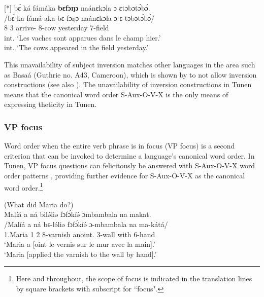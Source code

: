 \documentclass[output=paper,colorlinks,citecolor=brown
]{langscibook}
\begin{document}
\ea
[*]{
\label{cowinversion}
\glll
{\db}bɛ́ ká fámáka \textbf{bɛfɔŋɔ} naánɛkɔla ɔ ɛtɔbɔtɔ́bɔ́. \\
/bɛ́ ka fámá-aka bɛ-fɔŋɔ naánɛkɔla ɔ ɛ-tɔbɔtɔ́bɔ́/ \\
{\db}8\SM{} \PST{}3{} arrive-\DUR{} 8-cow yesterday \PREP{} 7-field \\
\glt
int. `Les vaches sont apparues dans le champ hier.' \\ int. `The cows appeared in the field yesterday.' \jambox*{[JO 2608] }
}

\z

This unavailability of subject inversion matches other languages in the area such as Basaá (Guthrie no. A43, Cameroon), which is shown by \citet{HamlaouiMakasso2015} to not allow inversion constructions (see also \citealt{Hamlaoui2022}). The unavailability of inversion constructions in Tunen means that the canonical word order S-Aux-O-V-X is the only means of expressing theticity in Tunen.

\subsubsection{VP focus}
Word order when the entire verb phrase is in focus (VP focus) is a second criterion that can be invoked to determine a language's canonical word order. In Tunen, VP focus questions can felicitously be answered with S-Aux-O-V-X word order patterns , providing further evidence for S-Aux-O-V-X as the canonical word order.\footnote{Here and throughout, the scope of focus is indicated in the translation lines by square brackets with subscript \FOC{} for ``focus".}\largerpage[2]

\ea
\label{MariaVPvarnish}
(What did Maria do?) \\
\glll
{\db}Malíá a ná bilə́liə fɔfɔ́kíə́ ɔmbambala na makat. \\
/Malíá a ná bɛ-lə́liə fɔfɔ́kíə́ ɔ-mbambala na ma-kátá/ \\
{\db}1.Maria 1\SM{} \PST{}2{} 8-varnish anoint.\DUR{} 3-wall with 6-hand \\
\glt
`Maria a [oint le vernis sur le mur avec la main]\textsubscript{\FOC{}}.' \\ `Maria [applied the varnish to the wall by hand]\textsubscript{\FOC{}}.' \jambox*{[JO 2516] }
\end{document}
